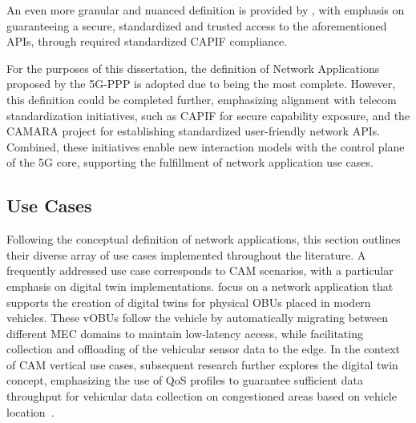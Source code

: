 An even more granular and nuanced definition is provided by \citet{CAPIFmicroserviceVerticals}, with emphasis on guaranteeing a secure, standardized and trusted access to the aforementioned \acsp{API}, through required standardized \acs{CAPIF} compliance.

For the purposes of this dissertation, the definition of Network Applications proposed by the 5G-PPP is adopted due to being the most complete. However, this definition could be completed further, emphasizing alignment with telecom standardization initiatives, such as \acs{CAPIF} for secure capability exposure, and the CAMARA project for establishing standardized user-friendly network \acsp{API}. Combined, these initiatives enable new interaction models with the control plane of the \acs{5G} core, supporting the fulfillment of network application use cases.



\subsection{Use Cases} \label{sota:networkapplications:usecases}

Following the conceptual definition of network applications, this section outlines their diverse array of use cases implemented throughout the literature. A frequently addressed use case corresponds to \ac{CAM} scenarios, with a particular emphasis on digital twin implementations. \citet{VirtualOnBoardUnitMigration} focus on a network application that supports the creation of digital twins for physical \acsp{OBU} placed in modern vehicles. These v\acsp{OBU} follow the vehicle by automatically migrating between different \ac{MEC} domains to maintain low-latency access, while facilitating collection and offloading of the vehicular sensor data to the edge. In the context of \acs{CAM} vertical use cases, subsequent research further explores the digital twin concept, emphasizing the use of \ac{QoS} profiles to guarantee sufficient data throughput for vehicular data collection on congestioned areas based on vehicle location~\cite{DynamicQoSAdaptationviaExposedServiceAPIs}.

